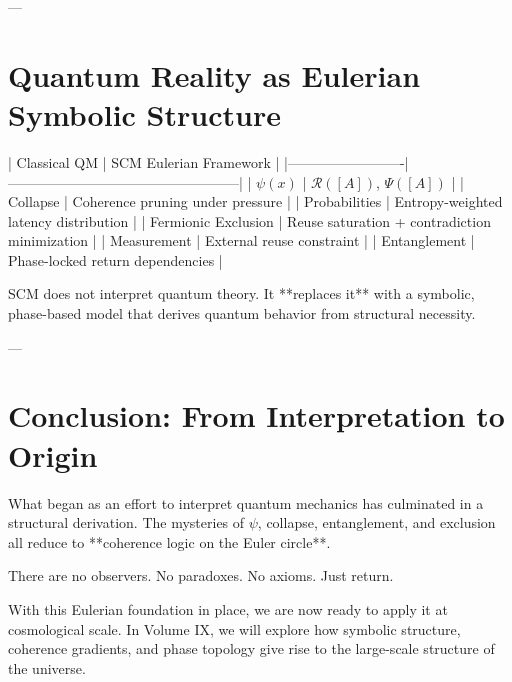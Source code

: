 ---

\section{Quantum Reality as Eulerian Symbolic Structure}

| Classical QM            | SCM Eulerian Framework                          |
|-------------------------|--------------------------------------------------|
| $\psi(x)$               | $\mathcal{R}([A])$, $\Psi([A])$                 |
| Collapse                | Coherence pruning under pressure                |
| Probabilities           | Entropy-weighted latency distribution           |
| Fermionic Exclusion     | Reuse saturation + contradiction minimization   |
| Measurement             | External reuse constraint                       |
| Entanglement            | Phase-locked return dependencies                |

SCM does not interpret quantum theory. It **replaces it** with a symbolic, phase-based model that derives quantum behavior from structural necessity.

---

\section{Conclusion: From Interpretation to Origin}

What began as an effort to interpret quantum mechanics has culminated in a structural derivation. The mysteries of $\psi$, collapse, entanglement, and exclusion all reduce to **coherence logic on the Euler circle**.

There are no observers. No paradoxes. No axioms. Just return.

With this Eulerian foundation in place, we are now ready to apply it at cosmological scale. In Volume IX, we will explore how symbolic structure, coherence gradients, and phase topology give rise to the large-scale structure of the universe.
